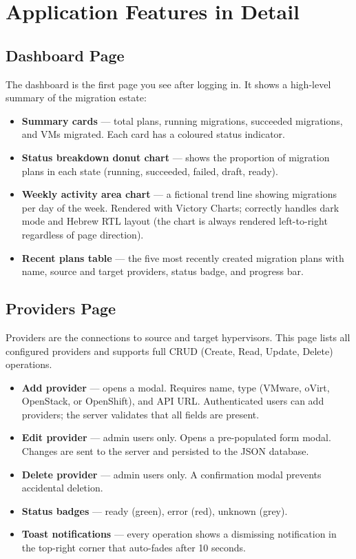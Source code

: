 \documentclass[12pt,a4paper]{article}
\begin{document}
\section{Application Features in Detail}

\subsection{Dashboard Page}

The dashboard is the first page you see after logging in. It shows a high-level summary of the migration estate:

\begin{itemize}
  \item \textbf{Summary cards} — total plans, running migrations, succeeded migrations, and VMs migrated. Each card has a coloured status indicator.
  \item \textbf{Status breakdown donut chart} — shows the proportion of migration plans in each state (running, succeeded, failed, draft, ready).
  \item \textbf{Weekly activity area chart} — a fictional trend line showing migrations per day of the week. Rendered with Victory Charts; correctly handles dark mode and Hebrew RTL layout (the chart is always rendered left-to-right regardless of page direction).
  \item \textbf{Recent plans table} — the five most recently created migration plans with name, source and target providers, status badge, and progress bar.
\end{itemize}

\subsection{Providers Page}

Providers are the connections to source and target hypervisors. This page lists all configured providers and supports full CRUD (Create, Read, Update, Delete) operations.

\begin{itemize}
  \item \textbf{Add provider} — opens a modal. Requires name, type (VMware, oVirt, OpenStack, or OpenShift), and API URL. Authenticated users can add providers; the server validates that all fields are present.
  \item \textbf{Edit provider} — admin users only. Opens a pre-populated form modal. Changes are sent to the server and persisted to the JSON database.
  \item \textbf{Delete provider} — admin users only. A confirmation modal prevents accidental deletion.
  \item \textbf{Status badges} — ready (green), error (red), unknown (grey).
  \item \textbf{Toast notifications} — every operation shows a dismissing notification in the top-right corner that auto-fades after 10 seconds.
\end{itemize}
\end{document}
